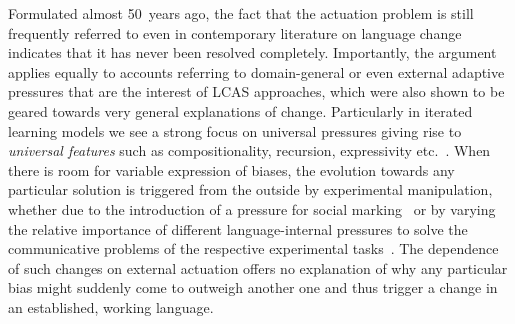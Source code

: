 Formulated almost 50~years ago, the fact that the actuation problem is still frequently referred to even in contemporary literature on language change indicates that it has never been resolved completely. Importantly, the argument applies equally to accounts referring to domain-general or even external adaptive pressures that are the interest of LCAS approaches, which were also shown to be geared towards very general explanations of change. Particularly in iterated learning models we see a strong focus on universal pressures giving rise to \emph{universal features} such as compositionality, recursion, expressivity etc.~\citep{Brighton2002,Kirby2002,Cornish2009,Smith2013,Kirby2015}. %
When there is room for variable expression of biases, the evolution towards any particular solution is triggered from the outside by experimental manipulation, whether due to the introduction of a pressure for social marking~\citep{Roberts2013} or by varying the relative importance of different language-internal pressures to solve the communicative problems of the respective experimental tasks~\citep{Winters2015}. The dependence of such changes on external actuation offers no explanation of why any particular bias might suddenly come to outweigh another one and thus trigger a change in an established, working language.

